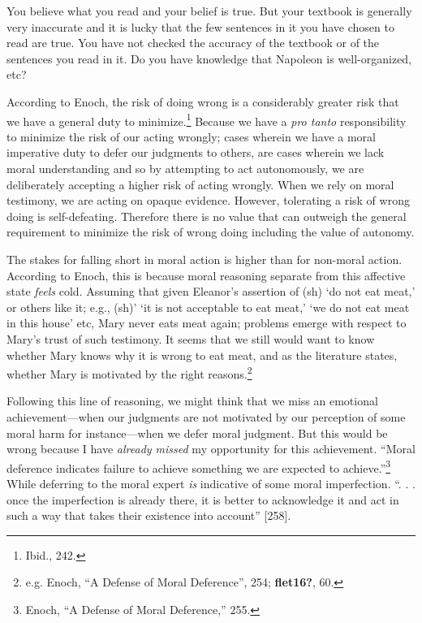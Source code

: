 \documentclass[phdthesis,12pt,final]{wuthesis}
\theoremstyle{definition}
\theoremstyle{definition}
\theoremstyle{definition}
\theoremstyle{definition}
\theoremstyle{remark}
\begin{document}
\begin{Shaded}
\begin{Highlighting}[]

\end{Highlighting}
\end{Shaded}

You believe what you read and your belief is true. But your textbook is generally very inaccurate and it is lucky that the few sentences in it you have chosen to read are true. You have not checked the accuracy of the textbook or of the sentences you read in it. Do you have knowledge that Napoleon is well-organized, etc?

According to Enoch, the risk of doing wrong is a considerably greater risk that we have a general duty to minimize.\footnote{Ibid., 242.} Because we have a \emph{pro tanto} responsibility to minimize the risk of our acting wrongly; cases wherein we have a moral imperative duty to defer our judgments to others, are cases wherein we lack moral understanding and so by attempting to act autonomously, we are deliberately accepting a higher risk of acting wrongly. When we rely on moral testimony, we are acting on opaque evidence. However, tolerating a risk of wrong doing is self-defeating. Therefore there is no value that can outweigh the general requirement to minimize the risk of wrong doing including the value of autonomy.

The stakes for falling short in moral action is higher than for non-moral action. According to Enoch, this is because moral reasoning separate from this affective state \emph{feels} cold. Assuming that given Eleanor's assertion of (sh) `do not eat meat,' or others like it; e.g., (sh)' `it is not acceptable to eat meat,' `we do not eat meat in this house' etc, Mary never eats meat again; problems emerge with respect to Mary's trust of such testimony. It seems that we still would want to know whether Mary knows why it is wrong to eat meat, and as the literature states, whether Mary is motivated by the right reasons.\footnote{e.g. Enoch, {``A {Defense} of {Moral Deference}''}, 254; \textbf{flet16?}, 60.}

Following this line of reasoning, we might think that we miss an emotional achievement---when our judgments are not motivated by our perception of some moral harm for instance---when we defer moral judgment. But this would be wrong because I have \emph{already missed} my opportunity for this achievement. ``Moral deference indicates failure to achieve something we are expected to achieve.''\footnote{Enoch, {``A {Defense} of {Moral Deference},''} 255.} While deferring to the moral expert \emph{is} indicative of some moral imperfection. ``. . . once the imperfection is already there, it is better to acknowledge it and act in such a way that takes their existence into account'' {[}258{]}.
\end{document}
